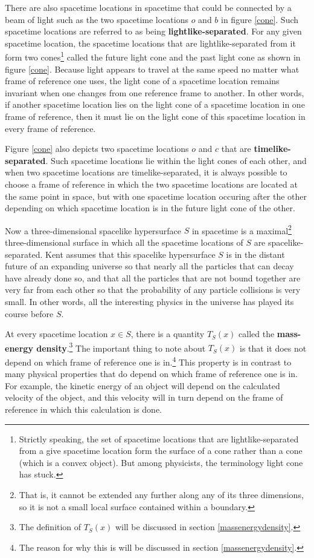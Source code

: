 There are also spacetime locations in spacetime that could be connected by a beam of light such as the two spacetime locations $o$ and $b$ in figure \ref{cone}. Such spacetime locations are referred to as being \textbf{lightlike-separated}. For any given spacetime location, the spacetime locations that are lightlike-separated from it form two cones\footnote{Strictly speaking, the set of spacetime locations that are lightlike-separated from a give spacetime location form the surface of a cone rather than a cone (which is a convex object). But among physicists, the terminology light cone has stuck.} called the future light cone and the past light cone as shown in figure \ref{cone}. Because light appears to travel at the same speed no matter what frame of reference one uses, the light cone of a spacetime location remains invariant when one changes from one reference frame to another. In other words, if another spacetime location lies on the light cone of a spacetime location in one frame of reference, then it must lie on the light cone of this spacetime location in every frame of reference. 

Figure \ref{cone} also depicts two spacetime locations $o$ and $c$ that are \textbf{timelike-separated}. Such spacetime locations lie within the light cones of each other, and when two spacetime locations are timelike-separated, it is always possible to choose a frame of reference in which the two spacetime locations are located at the same point in space, but with one spacetime location occuring after the other  depending on which spacetime location is in  the future light cone of the other. 

Now a three-dimensional spacelike hypersurface $S$ in spacetime is a maximal\footnote{That is, it cannot be extended any further along any of its three dimensions, so it is not a small local surface contained within a boundary.} three-dimensional surface in which all the spacetime locations of $S$ are spacelike-separated. Kent assumes that this spacelike hypersurface $S$ is in the distant future of an expanding universe so that nearly all the particles that can decay have already done so, and that all the particles that are not bound together are very far from each other so that the probability of any particle collisions is very small. In other words, all the interesting physics in the universe has played its course before $S$.

At every spacetime location $x\in S$, there is a quantity $T_S(x)$ called the \label{massenergydensity}\textbf{mass-energy density}.\footnote{The definition of $T_S(x)$ will be discussed in section \ref{massenergydensity}.} The important thing to note about $T_S(x)$ is that it does not depend on which frame of reference one is in.\footnote{The reason for why this is will be discussed in section \ref{massenergydensity}.}
  This property is in contrast to many physical properties that do depend on which frame of reference one is in. For example, the kinetic energy of an object will depend on the calculated velocity of the object, and this velocity will in turn depend on the frame of reference in which this calculation is done. 
  
